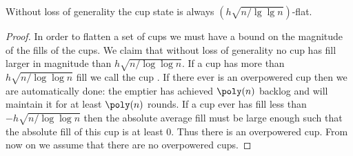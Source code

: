 \begin{clm}
  Without loss of generality the cup state is always $(h\sqrt{n/\lg\lg n})$-flat.
\end{clm}
\begin{proof}
In order to flatten a set of cups we must have a bound on the magnitude of the
fills of the cups. We claim that without loss of generality no cup has fill
larger in magnitude than $h\sqrt{n/\log\log n}$. If a cup has more than
$h\sqrt{n/\log\log n}$ fill we call the cup . If there ever
is an overpowered cup then we are automatically done: the emptier has achieved
$\poly(n)$ backlog and will maintain it for at least $\poly(n)$ rounds. If a
cup ever has fill less than $-h\sqrt{n/\log\log n}$ then the absolute average
fill must be large enough such that the absolute fill of this cup is at least
$0$. Thus there is an overpowered cup. From now on we assume that there are no
overpowered cups.
\end{proof}



